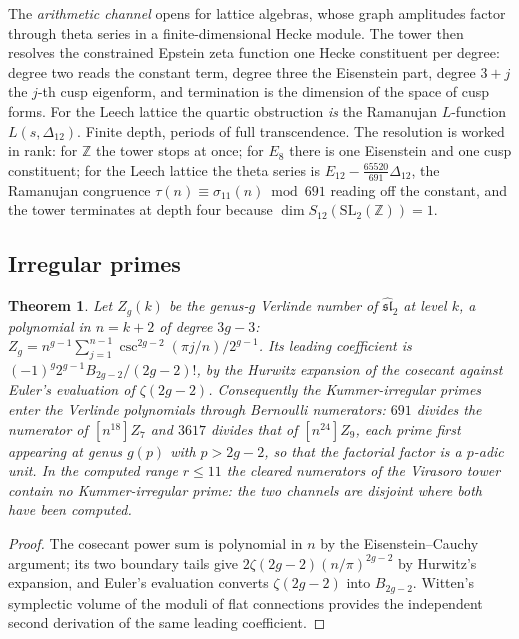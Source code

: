 \documentclass[11pt]{amsart}
\numberwithin{equation}{section}
\theoremstyle{plain}
\newtheorem{theorem}{Theorem}[section]
\theoremstyle{definition}
\theoremstyle{remark}
\newcommand{\bZ}{\mathbb{Z}}
\begin{document}
The \emph{arithmetic channel} opens for lattice algebras, whose graph
amplitudes factor through theta series in a finite-dimensional Hecke
module. The tower then resolves the constrained Epstein zeta function
one Hecke constituent per degree: degree two reads the constant term,
degree three the Eisenstein part, degree $3+j$ the $j$-th cusp
eigenform, and termination is the dimension of the space of cusp forms.
For the Leech lattice the quartic obstruction \emph{is} the Ramanujan
$L$-function $L(s,\Delta_{12})$. Finite depth, periods of full
transcendence. The resolution is worked in rank: for $\bZ$ the tower
stops at once; for $E_8$ there is one Eisenstein and one cusp
constituent; for the Leech lattice the theta series is
$E_{12}-\tfrac{65520}{691}\Delta_{12}$, the Ramanujan congruence
$\tau(n)\equiv\sigma_{11}(n)\bmod 691$ reading off the constant, and
the tower terminates at depth four because
$\dim S_{12}(\mathrm{SL}_2(\bZ))=1$.

\subsection{Irregular primes}

\begin{theorem}\label{thm:irregular}
Let $Z_g(k)$ be the genus-$g$ Verlinde number of $\widehat{\mathfrak{sl}}_2$
at level $k$, a polynomial in $n=k+2$ of degree $3g-3$:
$Z_g=n^{g-1}\sum_{j=1}^{n-1}\csc^{2g-2}(\pi j/n)/2^{g-1}$. Its leading
coefficient is $(-1)^{g}2^{g-1}B_{2g-2}/(2g-2)!$, by the Hurwitz
expansion of the cosecant against Euler's evaluation of $\zeta(2g-2)$.
Consequently the Kummer-irregular primes enter the Verlinde polynomials
through Bernoulli numerators: $691$ divides the numerator of
$[n^{18}]Z_7$ and $3617$ divides that of $[n^{24}]Z_9$, each prime
first appearing at genus $g(p)$ with $p>2g-2$, so that the factorial
factor is a $p$-adic unit. In the computed range $r\leq11$ the cleared
numerators of the Virasoro tower contain no Kummer-irregular prime:
the two channels are disjoint where both have been computed.
\end{theorem}

\begin{proof}
The cosecant power sum is polynomial in $n$ by the Eisenstein--Cauchy
argument; its two boundary tails give
$2\zeta(2g-2)(n/\pi)^{2g-2}$ by Hurwitz's expansion, and Euler's
evaluation converts $\zeta(2g-2)$ into $B_{2g-2}$. Witten's
symplectic volume of the moduli of flat connections \cite{WittenVol} provides the
independent second derivation of the same leading coefficient.
\end{proof}
\end{document}
